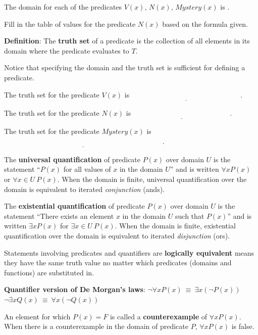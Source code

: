 \documentclass[12pt, oneside]{article}
\begin{document}
    The domain for each of the predicates $V(x)$, $N(x)$, $Mystery(x)$ is
    \underline{}.

    Fill in the table of values for the predicate $N(x)$ based on the formula given. \vfill


{\bf Definition}: The {\bf truth  set} of a  predicate is the collection of all elements in its
domain where the predicate evaluates to $T$.

Notice that specifying the domain and the truth set is sufficient for defining
a predicate. 

The truth set for the predicate $V(x)$ is $\underline{\phantom{\{ x ~\mid~ V(x) = T\} = \{ 001, 010, 011 \}}}$.

The truth set for the predicate $N(x)$ is $\underline{\phantom{\{ x ~\mid~ N(x) = T\} = \{ 101, 111 \}}}$.

The truth set for the predicate $Mystery(x)$ is $\underline{\phantom{\{ x ~\mid~ Mystery(x) = T\} = \{ 000, 001, 010, 101, 111 \}}}$.


\vfill \newpage


The {\bf universal quantification} of predicate $P(x)$ over
domain $U$ is the statement ``$P(x)$ for all values of $x$ in the domain $U$''
and is written $\forall x P(x)$ or $\forall x \in U ~P(x)$. 
When the domain is finite, universal quantification over the domain 
is equivalent to iterated {\it conjunction} (ands).

The {\bf existential quantification} of predicate $P(x)$ 
over domain $U$ is the statement ``There exists an element $x$ 
in the domain $U$ such that $P(x)$'' and is written $\exists x P(x)$
for $\exists x \in U ~P(x)$. 
When the domain is finite, existential quantification over the domain 
is equivalent to iterated {\it disjunction} (ors).
 \vfill


Statements involving predicates and quantifiers are {\bf logically equivalent} 
means they have the same truth value no matter which predicates (domains and functions) 
are substituted in. 

{\bf Quantifier version of De Morgan's laws}: 
$\boxed{\neg \forall x P(x) ~\equiv~ \exists x \left( \neg P(x) \right)}$
\qquad
\qquad
$\boxed{\neg \exists x Q(x) ~\equiv~ \forall x \left( \neg Q(x) \right)}$
 \vfill
\vfill


An element for which $P(x) = F$ is called a {\bf counterexample} of $\forall x P(x)$. When there is a counterexample in the domain of predicate $P$,  $\forall x P(x)$ is false.
\end{document}
